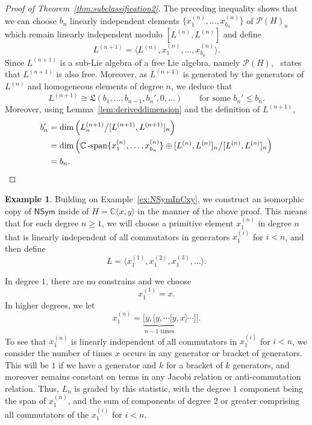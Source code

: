 \documentclass[11pt]{amsart}
\theoremstyle{definition}
\newtheorem{example}[theorem]{Example}
\numberwithin{equation}{section}
\def\CC{{\mathbb C}}
\begin{document}
\begin{proof}[Proof of Theorem~\ref{thm:subclassification2}]
The preceding inequality shows that we can choose $b_{n}$ linearly independent elements $\{x^{(n)}_{1}, \ldots, x^{(n)}_{b_{n}}\}$ of $\mathcal{P}(H)_{n}$ which remain linearly independent modulo $[L^{(n)}, L^{(n)}]$ and define
\[
L^{(n+1)} = \langle L^{(n)}, x^{(n)}_{1}, \ldots, x^{(n)}_{b_{n}} \rangle.
\]
Since $L^{(n+1)}$ is a sub-Lie algebra of a free Lie algebra, namely $\mathcal{P}(H)$,~\cite[Theorem 2.2]{MSZ} states that $L^{(n+1)}$ is also free.  
Moreover, as $L^{(n+1)}$ is generated by the generators of $L^{(n)}$ and homogeneous elements of degree $n$, we deduce that
\[
L^{(n+1)} \cong \mathfrak{L}(b_{1}, \ldots, b_{n-1}, b_{n}', 0, \ldots )
\qquad\text{for some $b_{n}' \le b_{n}$}.
\]
Moreover, using Lemma~\ref{lem:deriveddimension} and the definition of $L^{(n+1)}$,
\begin{align*}
b_{n}' &= \dim\left( L^{(n+1)}_{n} \big/ [L^{(n+1)}, L^{(n+1)}]_{n}\right) \\
&= \dim\left(  \CC\operatorname{-span}\{x^{(n)}_{1}, \ldots, x^{(n)}_{b_{n}}\} \oplus [L^{(n)}, L^{(n)}]_{n} \big/ [L^{(n)}, L^{(n)}]_{n} \right) \\
&= b_{n}. \qedhere
\end{align*}
\end{proof}

\begin{example}
Building on Example~\ref{ex:NSymInCxy}, we construct an isomorphic copy of $\mathsf{NSym}$ inside of $H = \CC\langle x, y \rangle$ in the manner of the above proof.  
This means that for each degree $n \ge 1$, we will choose a primitive element $x^{(n)}_{1}$ in degree $n$ that is linearly independent of all commutators in generators $x_{1}^{(i)}$ for $i < n$, and then define
\[
L = \langle x_{1}^{(1)}, x_{1}^{(2)}, x_{1}^{(3)}, \ldots \rangle. 
\]

In degree $1$, there are no constrains and we choose 
\[
x_{1}^{(1)} = x.
\]
In higher degrees, we let
\[
x_{1}^{(n)} = \underbrace{[y, [y, \cdots [y}_{\text{$n-1$ times}}, x] \cdots]].
\]
To see that $x_{1}^{(n)}$ is linearly independent of all commutators in $x_{1}^{(i)}$ for $i < n$, we consider the number of times $x$ occurs in any generator or bracket of generators.  
This will be $1$ if we have a generator and $k$ for a bracket of $k$ generators, and moreover remains constant on terms in any Jacobi relation or anti-commutation relation.  
Thus, $L_{n}$ is graded by this statistic, with the degree $1$ component being the span of $x_{1}^{(n)}$, and the sum of components of degree $2$ or greater comprising all commutators of the $x_{1}^{(i)}$ for $i < n$.  
\end{example}
\end{document}
